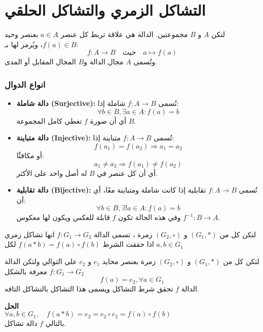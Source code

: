 \chapter{التشاكل الزمري والتشاكل الحلقي}

\begin{definition}
	لتكن $A$ و $B$ مجموعتين. الدالة هي علاقة تربط كل عنصر $a \in A$ بعنصر وحيد $f(a) \in B$، ويُرمز لها بـ:
	\[
	f : A \to B \quad \text{حيث} \quad a \mapsto f(a)
	\]
	وتُسمى $A$ مجال الدالة و$B$ المجال المقابل أو المدى.
\end{definition}

\subsection*{انواع الدوال}
	\begin{itemize}
		\item \textbf{دالة شاملة (Surjective):} تُسمى $f : A \to B$ شاملة إذا:
		\[
		\forall b \in B, \exists a \in A : f(a) = b
		\]
		أي أن صورة $f$ تغطي كامل المجموعة $B$.
		
		\item \textbf{دالة متباينة (Injective):} تُسمى $f : A \to B$ متباينة إذا:
		\[
		f(a_1) = f(a_2) \Rightarrow a_1 = a_2
		\]
		أو مكافئًا:
		\[
		a_1 \neq a_2 \Rightarrow f(a_1) \neq f(a_2)
		\]
		أي أن كل عنصر في $B$ له أصل واحد على الأكثر.
		
		\item \textbf{دالة تقابلية (Bijective):} تُسمى $f : A \to B$ تقابلية إذا كانت شاملة ومتباينة معًا، أي أن:
		\[
		\forall b \in B, \exists! a \in A : f(a) = b
		\]
		وفي هذه الحالة تكون $f$ قابلة للعكس ويكون لها معكوس $f^{-1} : B \to A$.
	\end{itemize}



\begin{definition}
	لتكن كل من $(G_1, *)$ و $(G_2, \circ)$ زمرة ، تسمى الدالة $f : G_1\to G_2 $ انها تشاكل زمري اذا حققت الشرط  $f(a * b) = f(a) \circ f(b)$ لكل $a, b \in G_1 $ 
\end{definition}

\begin{example}
	لتكن كل من $(G_1, *)$ و $(G_2, \circ)$ زمرة بعنصر محايد $e_1 $ و $e_2$ على التوالي ولتكن الدالة $f : G_1\to G_2 $ معرفة بالشكل 
	\[
	f(a) = e_2, \forall a\in G_1
	\]
	الدالة $f$ تحقق شرط التشاكل ويسمى هذا التشاكل بالتشاكل التافه.
\end{example}
\noindent
\textbf{الحل}\\
$
\forall a, b\in G_1 , \quad f(a * b) = e_2 = e_2 \circ e_2 = f(a) \circ f(b)
$\\
بالتالي $f$ دالة تشاكل.


